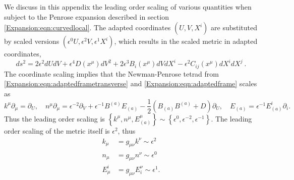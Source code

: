 	We discuss in this appendix the leading order scaling of various quantities when subject to the Penrose expansion
	described in section \ref{Expansion:eqn:curvedlocal}. The adapted coordinates $\left(U, V, X^{i}\right)$ are substituted by
	scaled versions $\left(\epsilon^{0} U, \epsilon^{2} V, \epsilon^{1} X^{i}\right)$, which results in the scaled
	metric in adapted coordinates,
	\begin{equation} \label{Expansion:eqn:scaledmetric} 
	ds^2 = 2 \epsilon^{2} dU dV + \epsilon^{4} D(x^{\mu}) dV^2 + 2 \epsilon^{3} B_i(x^{\mu}) dV dX^i - \epsilon^{2}
	C_{ij}(x^{\mu})dX^i dX^j \ .
	\end{equation}
	The coordinate scaling implies that the Newman-Penrose tetrad from \eqref{Expansion:eqn:adaptedframetransverse} and
	\eqref{Expansion:eqn:adaptedframe} scales as
	\begin{equation}  
	k^{\mu} \partial_{\mu} = \partial_{U}, \quad  n^{\mu} \partial_{\mu} = \epsilon^{-2} \partial_{V} + \epsilon^{-1}
	B^{(a)} E_{(a)} - \frac{1}{2} \left( B_{(a)} B^{(a)} + D\right) \partial_{U}, \quad E_{(a)} = \epsilon^{-1}
	E^{i}_{(a)} \partial_{i}.
	\end{equation}
	Thus the leading order scaling is $\left\lbrace k^{\mu}, n^{\mu},  E^{\mu}_{(a)} \right\rbrace \sim \left\lbrace
	\epsilon^0, \epsilon^{-2},  \epsilon^{-1} \right\rbrace $. The leading order scaling of the metric itself is
	$\epsilon^{2}$, thus
	\begin{align}  
	k_{\mu} &= g_{\mu \nu} k^{\nu} \sim \epsilon^{2} \\
	n_{\mu} &= g_{\mu \nu} n^{\nu} \sim \epsilon^{0} \\
	E_{\mu}^{i} &= g_{\mu \nu} E^{\nu}_{i} \sim \epsilon^{1}.
	\end{align}
	
